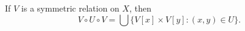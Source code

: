 If $V$ is a symmetric relation on $X$, then
$$V \circ U \circ V = \bigcup \{V[x] \times V[y] : (x,y) \in U\}.$$
